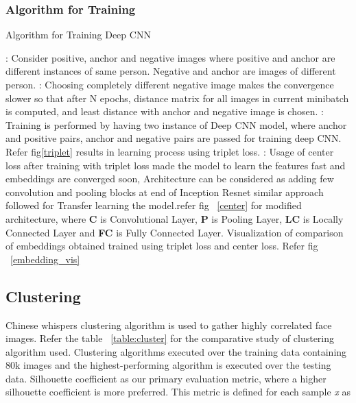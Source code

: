 \documentclass[a4paper,12pt, twoside]{NITKReport}
\begin{document}
\subsubsection{Algorithm for Training}
\begin{algorithm}
\caption{Algorithm for Training Deep CNN}
\begin{algorithmic} 
: Consider positive, anchor and negative images where positive and anchor are different instances of same person. Negative and anchor are images of different person.
: Choosing completely different negative image makes the convergence slower so that after N epochs, distance matrix for all images in current minibatch is computed, and least distance with anchor and negative image is chosen. 
: Training is performed by having two instance of Deep CNN model, where anchor and positive pairs, anchor and negative pairs are passed for training deep CNN. Refer fig\ref{triplet} results in learning process using triplet loss.
: Usage of center loss after training with triplet loss made the model to learn the features fast and embeddings are converged soon, Architecture can be considered as adding few convolution and pooling blocks at end of Inception Resnet similar approach followed for Transfer learning the model.refer fig ~\ref{center} for modified architecture, where \textbf{C} is Convolutional Layer, \textbf{P} is Pooling Layer, \textbf{LC} is Locally Connected Layer and \textbf{FC} is Fully Connected Layer. Visualization of comparison of embeddings obtained trained using triplet loss and center loss. Refer fig ~\ref{embedding_vis}

\end{algorithmic}
\end{algorithm}



\subsection{Clustering}
\par Chinese whispers clustering algorithm is used to gather highly correlated face images. Refer the table ~\ref{table:cluster} for the comparative study of clustering algorithm used. Clustering algorithms executed over the training data containing 80k images and the highest-performing algorithm is executed over the testing data. Silhouette coefficient as our primary evaluation metric, where a higher silhouette coefficient is more preferred. This metric is defined for each sample \textit{x} as
\end{document}
